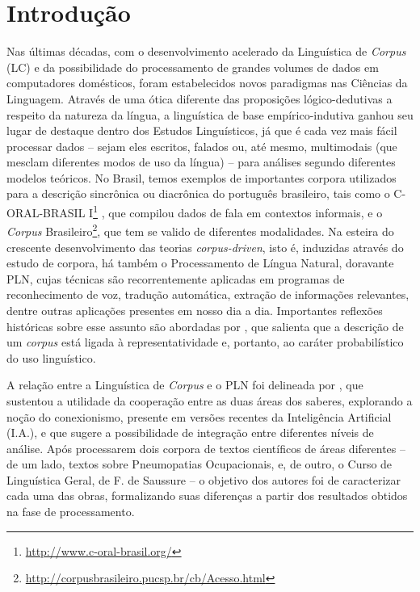 \documentclass[portuguese]{textolivre}
\begin{document}
\section{Introdução}\label{sec-intro}
Nas últimas décadas, com o desenvolvimento acelerado da Linguística de \textit{Corpus} (LC) e da possibilidade do processamento de grandes volumes de dados em computadores domésticos, foram estabelecidos novos paradigmas nas Ciências da Linguagem. Através de uma ótica diferente das proposições lógico-dedutivas a respeito da natureza da língua, a linguística de base empírico-indutiva ganhou seu lugar de destaque dentro dos Estudos Linguísticos, já que é cada vez mais fácil processar dados – sejam eles escritos, falados ou, até mesmo, multimodais (que mesclam diferentes modos de uso da língua) – para análises segundo diferentes modelos teóricos. No Brasil, temos exemplos de importantes corpora utilizados para a descrição sincrônica ou diacrônica do português brasileiro, tais como o C-ORAL-BRASIL I\footnote{\url{http://www.c-oral-brasil.org/}} \cite{raso_c-oral_2012}, que compilou dados de fala em contextos informais, e o \textit{Corpus} Brasileiro\footnote{\url{http://corpusbrasileiro.pucsp.br/cb/Acesso.html}}, que tem se valido de diferentes modalidades. Na esteira do crescente desenvolvimento das teorias \textit{corpus-driven}, isto é, induzidas através do estudo de corpora, há também o Processamento de Língua Natural, doravante PLN, cujas técnicas são recorrentemente aplicadas em programas de reconhecimento de voz, tradução automática, extração de informações relevantes, dentre outras aplicações presentes em nosso dia a dia. Importantes reflexões históricas sobre esse assunto são abordadas por \textcite{berber_sardinha_linguistica_2000}, que salienta que a descrição de um \textit{corpus} está ligada à representatividade e, portanto, ao caráter probabilístico do uso linguístico.

A relação entre a Linguística de \textit{Corpus} e o PLN foi delineada por \textcite{finatto_processamento_2015}, que sustentou a utilidade da cooperação entre as duas áreas dos saberes, explorando a noção do conexionismo, presente em versões recentes da Inteligência Artificial (I.A.), e que sugere a possibilidade de integração entre diferentes níveis de análise. Após processarem dois corpora de textos científicos de áreas diferentes – de um lado, textos sobre Pneumopatias Ocupacionais, e, de outro, o Curso de Linguística Geral, de F. de Saussure – o objetivo dos autores foi de caracterizar cada uma das obras, formalizando suas diferenças a partir dos resultados obtidos na fase de processamento.
\end{document}
